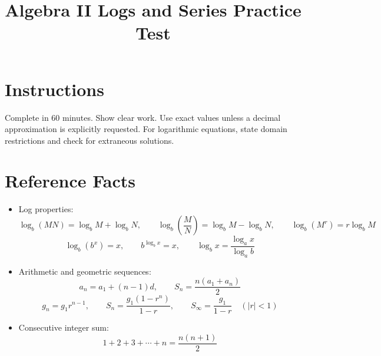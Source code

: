 \documentclass[12pt]{article}
\title{Algebra II Logs and Series Practice Test}
\author{}
\date{}
\begin{document}
\maketitle

\section*{Instructions}
Complete in 60 minutes. Show clear work. Use exact values unless a decimal approximation is explicitly requested. For logarithmic equations, state domain restrictions and check for extraneous solutions.

\section*{Reference Facts}
\begin{itemize}[leftmargin=1.5em]
  \item Log properties:
  \[
  \log_b(MN)=\log_bM+\log_bN,\qquad
  \log_b\!\left(\frac{M}{N}\right)=\log_bM-\log_bN,\qquad
  \log_b(M^r)=r\log_bM
  \]
  \[
  \log_b(b^x)=x,\qquad b^{\log_b x}=x,\qquad
  \log_bx=\frac{\log_a x}{\log_a b}
  \]
  \item Arithmetic and geometric sequences:
  \[
  a_n=a_1+(n-1)d,\qquad S_n=\frac{n(a_1+a_n)}{2}
  \]
  \[
  g_n=g_1r^{n-1},\qquad S_n=\frac{g_1(1-r^n)}{1-r},\qquad
  S_\infty=\frac{g_1}{1-r}\quad(|r|<1)
  \]
  \item Consecutive integer sum:
  \[
  1+2+3+\cdots+n=\frac{n(n+1)}{2}
  \]
\end{itemize}
\end{document}
